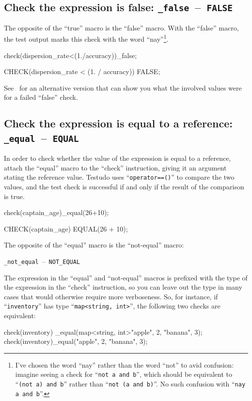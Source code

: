\documentclass[twoside, a4paper, article]{memoir}
\newcommand*\testudocolor{\color{red!80!blue}}
\newcommand*\testudo[1]{\texttt{\testudocolor{}#1}}
\newcommand*\testudopair[2]{\testudo{#1}~--~\testudo{#2}}
\newcommand\subsectiontestudopair[3]{%
  \subsection[#1]{#1: \testudopair{#2}{#3}}}
\begin{document}
\subsectiontestudopair{Check the expression is false}{\_false}{FALSE}
\label{sec:check-expression-true}

The opposite of the ``true'' macro is the ``false'' macro.  With the ``false''
macro, the test output marks this check with the word ``nay''\footnote{I've
  chosen the word ``nay'' rather than the word ``not'' to avid confusion:
  imagine seeing a check for ``\texttt{not a and b}'', which should be
  equivalent to ``\texttt{(not a) and b}'' rather than ``\texttt{not (a and
    b)}''.  No such confusion with ``\texttt{nay a and b}''.}.

\begin{cpplisting}
check(dispersion_rate<(1./accuracy))_false;
\end{cpplisting}

\begin{cpplisting}
CHECK(dispersion_rate < (1. / accuracy)) FALSE;
\end{cpplisting}

See~ for an alternative version that can
show you what the involved values were for a failed ``false'' check.

\subsectiontestudopair{Check the expression is equal to a reference}%
  {\_equal}{EQUAL}
\label{sec:check-expression-equal-reference}

In order to check whether the value of the expression is equal to a reference,
attach the ``equal'' macro to the ``check'' instruction, giving it an argument
stating the reference value.  Testudo uses ``\texttt{operator==()}'' to
compare the two values, and the test check is successful if and only if the
result of the comparison is true.

\begin{cpplisting}
check(captain_age)_equal(26+10);
\end{cpplisting}

\begin{cpplisting}
CHECK(captain_age) EQUAL(26 + 10);
\end{cpplisting}

The opposite of the ``equal'' macro is the ``not-equal'' macro:
\begin{center}
  \testudopair{\_not\_equal}{NOT\_EQUAL}
\end{center}

The expression in the ``equal'' and ``not-equal'' macros is prefixed with the
type of the expression in the ``check'' instruction, so you can leave out the
type in many cases that would otherwise require more verboseness.  So, for
instance, if ``\texttt{inventory}'' has type ``\texttt{map<string, int>}'', the
following two checks are equivalent:
\begin{cpplisting}
check(inventory)
  _equal(map<string, int>{{"apple", 2}, {"banana", 3}});
check(inventory)_equal({{"apple", 2}, {"banana", 3}});
\end{cpplisting}
\end{document}
